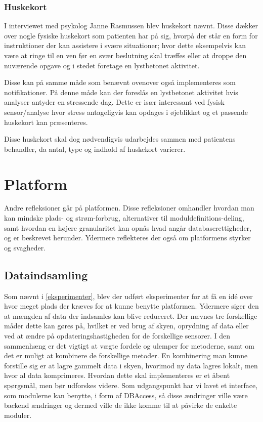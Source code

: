 \subsubsection{Huskekort}
I interviewet med psykolog Janne Rasmussen blev huskekort nævnt.
Disse dækker over nogle fysiske huskekort som patienten har på sig, hvorpå der står en form for instruktioner der kan assistere i svære situationer; hvor dette eksempelvis kan være at ringe til en ven før en svær beslutning skal træffes eller at droppe den nuværende opgave og i stedet foretage en lystbetonet aktivitet.

Disse kan på samme måde som benævnt ovenover også implementeres som notifikationer.
På denne måde kan der foreslås en lystbetonet aktivitet hvis analyser antyder en stressende dag.
Dette er især interessant ved fysisk sensor/analyse hvor stress antageligvis kan opdages i øjeblikket og et passende huskekort kan præsenteres.

Disse huskekort skal dog nødvendigvis udarbejdes sammen med patientens behandler, da antal, type og indhold af huskekort varierer.

\section{Platform}
Andre refleksioner går på platformen.
Disse refleksioner omhandler hvordan man kan mindske plads- og strøm-forbrug, alternativer til moduldefinitions-deling, samt hvordan en højere granularitet kan opnås hvad angår databaserettigheder, og er beskrevet herunder.
Ydermere reflekteres der også om platformens styrker og svagheder.

\subsection{Dataindsamling}
Som nævnt i \cref{eksperimenter}, blev der udført eksperimenter for at få en idé over hvor meget plads der kræves for at kunne benytte platformen.
Ydermere siger den at mængden af data der indsamles kan blive reduceret.
Der nævnes tre forskellige måder dette kan gøres på, hvilket er ved brug af skyen, oprydning af data eller ved at ændre på opdateringshastigheden for de forskellige sensorer.
I den sammenhæng er det vigtigt at vægte fordele og ulemper for metoderne, samt om det er muligt at kombinere de forskellige metoder.
En kombinering man kunne forstille sig er at lagre gammelt data i skyen, hvorimod ny data lagres lokalt, men hvor al data komprimeres.
Hvordan dette skal implementeres er et åbent spørgsmål, men bør udforskes videre.
Som udgangspunkt har vi lavet et interface, som modulerne kan benytte, i form af DBAccess, så disse ændringer ville være backend ændringer og dermed ville de ikke komme til at påvirke de enkelte moduler.



